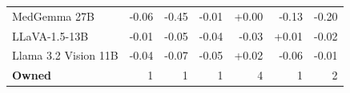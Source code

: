\begin{table}[h]
\begin{tabular}{lrrrrrr}
MedGemma 27B & \cellcolor{cfTerra2}-0.06 & \cellcolor{cfTerra4}-0.45 & \cellcolor{cfTerra1}-0.01 & \cellcolor{cfSlate1}+0.00 & \cellcolor{cfTerra3}-0.13 & \cellcolor{cfTerra3}-0.20 \\
LLaVA-1.5-13B & \cellcolor{cfTerra1}-0.01 & \cellcolor{cfTerra2}-0.05 & \cellcolor{cfTerra2}-0.04 & \cellcolor{cfTerra2}-0.03 & \cellcolor{cfSlate1}+0.01 & \cellcolor{cfTerra1}-0.02 \\
Llama 3.2 Vision 11B & \cellcolor{cfTerra2}-0.04 & \cellcolor{cfTerra2}-0.07 & \cellcolor{cfTerra2}-0.05 & \cellcolor{cfSlate2}+0.02 & \cellcolor{cfTerra2}-0.06 & \cellcolor{cfTerra1}-0.01 \\
\midrule
\textbf{Owned} & 1 & 1 & 1 & 4 & 1 & 2 \\
\bottomrule
\end{tabular}
\end{table}
